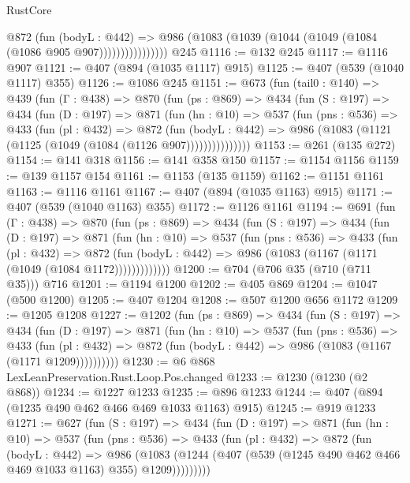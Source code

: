 \begin{lexlean}{RustCore}
\begin{coremodule}
{\begin{coremodule}
{{{{{{                    @872
                      (fun (bodyL : @442) =>
                      @986 (@1083 (@1039 (@1044 (@1049 (@1084 (@1086 @905 @907))))))))))))))))
    @245
@1116 := @132 @245
@1117 := @1116 @907
@1121 := @407 (@894 (@1035 @1117) @915)
@1125 := @407 (@539 (@1040 @1117) @355)
@1126 := @1086 @245
@1151 := @673
    (fun (tail0 : @140) =>
    @439
      (fun (Γ : @438) =>
      @870
        (fun (ps : @869) =>
        @434
          (fun (S : @197) =>
          @434
            (fun (D : @197) =>
            @871
              (fun (hn : @10) =>
              @537
                (fun (pns : @536) =>
                @433
                  (fun (pl : @432) =>
                  @872
                    (fun (bodyL : @442) =>
                    @986 (@1083 (@1121 (@1125 (@1049 (@1084 (@1126 @907)))))))))))))))
@1153 := @261 (@135 @272)
@1154 := @141 @318
@1156 := @141 @358 @150
@1157 := @1154 @1156
@1159 := @139 @1157 @154
@1161 := @1153 (@135 @1159)
@1162 := @1151 @1161
@1163 := @1116 @1161
@1167 := @407 (@894 (@1035 @1163) @915)
@1171 := @407 (@539 (@1040 @1163) @355)
@1172 := @1126 @1161
@1194 := @691
    (fun (Γ : @438) =>
    @870
      (fun (ps : @869) =>
      @434
        (fun (S : @197) =>
        @434
          (fun (D : @197) =>
          @871
            (fun (hn : @10) =>
            @537
              (fun (pns : @536) =>
              @433
                (fun (pl : @432) =>
                @872
                  (fun (bodyL : @442) => @986 (@1083 (@1167 (@1171 (@1049 (@1084 @1172)))))))))))))
@1200 := @704 (@706 @35 (@710 (@711 @35))) @716
@1201 := @1194 @1200
@1202 := @405 @869
@1204 := @1047 (@500 @1200)
@1205 := @407 @1204
@1208 := @507 @1200 @656 @1172
@1209 := @1205 @1208
@1227 := @1202
    (fun (ps : @869) =>
    @434
      (fun (S : @197) =>
      @434
        (fun (D : @197) =>
        @871
          (fun (hn : @10) =>
          @537
            (fun (pns : @536) =>
            @433
              (fun (pl : @432) =>
              @872 (fun (bodyL : @442) => @986 (@1083 (@1167 (@1171 @1209))))))))))
@1230 := @6 @868 LexLeanPreservation.Rust.Loop.Pos.changed
@1233 := @1230 (@1230 (@2 @868))
@1234 := @1227 @1233
@1235 := @896 @1233
@1244 := @407 (@894 (@1235 @490 @462 @466 @469 @1033 @1163) @915)
@1245 := @919 @1233
@1271 := @627
    (fun (S : @197) =>
    @434
      (fun (D : @197) =>
      @871
        (fun (hn : @10) =>
        @537
          (fun (pns : @536) =>
          @433
            (fun (pl : @432) =>
            @872
              (fun (bodyL : @442) =>
              @986
                (@1083
                  (@1244 (@407 (@539 (@1245 @490 @462 @466 @469 @1033 @1163) @355) @1209)))))))))
}}}}}}
\end{coremodule}}
\end{coremodule}
\end{lexlean}
